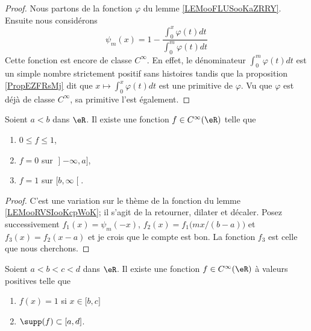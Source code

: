 \begin{proof}
    Nous partons de la fonction \( \varphi\) du lemme \ref{LEMooFLUSooKaZRRY}. Ensuite nous considérons
\begin{equation}
    \psi_m(x)=1-\frac{ \int_0^x \varphi(t)dt }{ \int_0^m\varphi(t)dt}
\end{equation}
Cette fonction est encore de classe $ C^{\infty}$. En effet, le dénominateur \( \int_0^m\varphi(t)dt\) est un simple nombre strictement positif sans histoires tandis que la proposition \ref{PropEZFRsMj} dit que \( x\mapsto \int_0^x\varphi(t)dt\) est une primitive de \( \varphi\). Vu que \( \varphi\) est déjà de classe \(  C^{\infty}\), sa primitive l'est également.
\end{proof}

\begin{lemma}
    Soient \( a<b\) dans \( \eR\). Il existe une fonction \( f\in  C^{\infty}(\eR)\) telle que
    \begin{enumerate}
        \item
            \( 0\leq f\leq 1\),
        \item
        \( f=0\) sur \( \mathopen] -\infty , a \mathclose]\),
    \item
        \( f=1\) sur \( \mathopen[ b , \infty \mathclose[\).
    \end{enumerate}
\end{lemma}

\begin{proof}
    C'est une variation sur le thème de la fonction du lemme \ref{LEMooRVSIooKcpWoK}; il s'agit de la retourner, dilater et décaler. Posez successivement \( f_1(x)=\psi_m(-x)\), \( f_2(x)=f_1\big(mx/(b-a)\big)\) et \( f_3(x)=f_2(x-a)\) et je crois que le compte est bon. La fonction \( f_3\) est celle que nous cherchons.
\end{proof}

\begin{proposition}     \label{PROPooAZJZooTYWjzb}
Soient \( a<b<c<d\) dans \( \eR\). Il existe une fonction \( f\in C^{\infty}(\eR)\) à valeurs positives telle que
\begin{enumerate}
    \item
        \( f(x)=1\) si \( x\in\mathopen[ b , c \mathclose]\)
    \item
        \( \supp(f)\subset\mathopen[ a , d \mathclose]\).
\end{enumerate}
\end{proposition}

